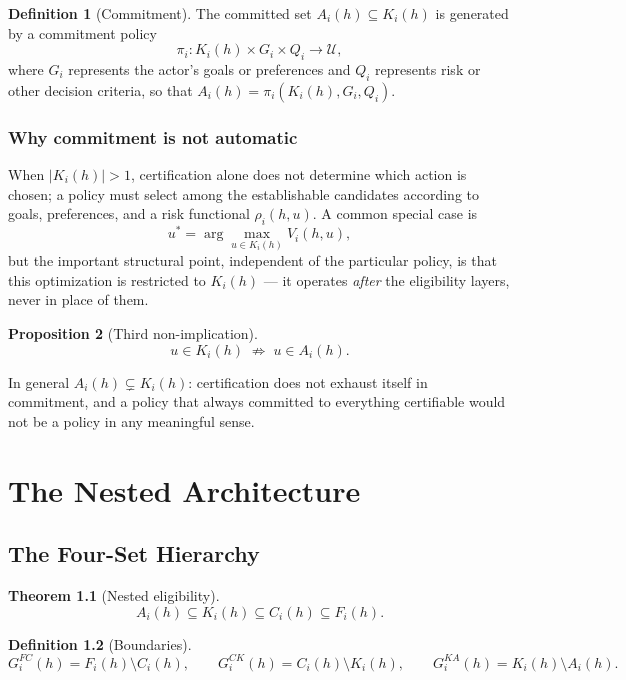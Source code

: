 \documentclass[11pt]{report}
\theoremstyle{definition}
\newtheorem{definition}{Definition}[chapter]
\theoremstyle{plain}
\newtheorem{proposition}[definition]{Proposition}
\newtheorem{theorem}[definition]{Theorem}
\newcommand{\Uni}{\mathcal{U}}
\begin{document}
\begin{definition}[Commitment]
The committed set $A_i(h) \subseteq K_i(h)$ is generated by a commitment policy
\[
\pi_i: K_i(h) \times G_i \times Q_i \to \Uni,
\]
where $G_i$ represents the actor's goals or preferences and $Q_i$ represents risk or other decision criteria, so that $A_i(h) = \pi_i(K_i(h), G_i, Q_i)$.
\end{definition}

\section{Why commitment is not automatic}
When $|K_i(h)| > 1$, certification alone does not determine which action is chosen; a policy must select among the establishable candidates according to goals, preferences, and a risk functional $\rho_i(h,u)$. A common special case is
\[
u^\ast = \arg\max_{u \in K_i(h)} V_i(h,u),
\]
but the important structural point, independent of the particular policy, is that this optimization is restricted to $K_i(h)$ --- it operates \emph{after} the eligibility layers, never in place of them.

\begin{proposition}[Third non-implication]
\[
u \in K_i(h) \;\not\Rightarrow\; u \in A_i(h).
\]
\end{proposition}
In general $A_i(h) \subsetneq K_i(h)$: certification does not exhaust itself in commitment, and a policy that always committed to everything certifiable would not be a policy in any meaningful sense.

\part{The Nested Architecture}

\chapter{The Four-Set Hierarchy}

\begin{theorem}[Nested eligibility]
\[
A_i(h) \subseteq K_i(h) \subseteq C_i(h) \subseteq F_i(h).
\]
\end{theorem}

\begin{definition}[Boundaries]
\[
G^{FC}_i(h) = F_i(h) \setminus C_i(h), \qquad
G^{CK}_i(h) = C_i(h) \setminus K_i(h), \qquad
G^{KA}_i(h) = K_i(h) \setminus A_i(h).
\]
\end{definition}
\end{document}
